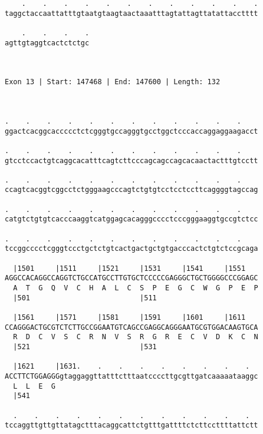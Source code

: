 \documentclass{article}
\begin{document}
\begin{Verbatim}
    .    .    .    .    .    .    .    .    .    .    .    .
taggctaccaattatttgtaatgtaagtaactaaatttagtattagttatattacctttt
                                                            
    .    .    .    .
agttgtaggtcactctctgc
                    
                    
 
Exon 13 | Start: 147468 | End: 147600 | Length: 132



.    .    .    .    .    .    .    .    .    .    .    .    
ggactcacggcaccccctctcgggtgccagggtgcctggctcccaccaggaggaagacct
                                                            
.    .    .    .    .    .    .    .    .    .    .    .    
gtcctccactgtcaggcacatttcagtcttcccagcagccagcacaactactttgtcctt
                                                            
.    .    .    .    .    .    .    .    .    .    .    .    
ccagtcacggtcggcctctgggaagcccagtctgtgtcctcctccttcaggggtagccag
                                                            
.    .    .    .    .    .    .    .    .    .    .    .    
catgtctgtgtcacccaaggtcatggagcacagggcccctcccgggaaggtgccgtctcc
                                                            
.    .    .    .    .    .    .    .    .    .    .    .    
tccggcccctcgggtccctgctctgtcactgactgctgtgacccactctgtctccgcaga
                                                            
  |1501     |1511     |1521     |1531     |1541     |1551   
AGGCCACAGGCCAGGTCTGCCATGCCTTGTGCTCCCCCGAGGGCTGCTGGGGCCCGGAGC
  A  T  G  Q  V  C  H  A  L  C  S  P  E  G  C  W  G  P  E  P
  |501                          |511                        
  
  |1561     |1571     |1581     |1591     |1601     |1611   
CCAGGGACTGCGTCTCTTGCCGGAATGTCAGCCGAGGCAGGGAATGCGTGGACAAGTGCA
  R  D  C  V  S  C  R  N  V  S  R  G  R  E  C  V  D  K  C  N
  |521                          |531                        
  
  |1621     |1631.    .    .    .    .    .    .    .    .  
ACCTTCTGGAGGGgtaggaggttatttctttaatccccttgcgttgatcaaaaataaggc
  L  L  E  G                                                
  |541                                                      
  
  .    .    .    .    .    .    .    .    .    .    .    .  
tccaggttgttgttatagctttacaggcattctgtttgattttctcttccttttattctt
                                                            

\end{Verbatim}
\end{document}
